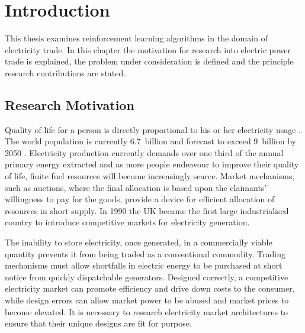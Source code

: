 \chapter{Introduction}
This thesis examines reinforcement learning algorithms in the domain of
electricity trade.  In this chapter the motivation for research into
electric power trade is explained, the problem under consideration is defined
and the principle research contributions are stated.

\section{Research Motivation}
Quality of life for a person is directly proportional to his or her electricity
usage \cite{alam:qol}.  The world population is currently 6.7~billion and
forecast to exceed 9~billion by 2050 \cite{un:pop}. Electricity production
currently demands over one third of the annual primary energy extracted
\cite{iea:2010} and as more people endeavour to improve their quality of life,
finite fuel resources will become increasingly scarce. Market mechanisms, such
as auctions, where the final allocation is based upon the claimants' willingness
to pay for the goods, provide a device for efficient allocation of resources in
short supply.  In 1990 the UK became the first large industrialised
country to introduce competitive markets for electricity generation.

The inability to store electricity, once generated, in a commercially viable
quantity prevents it from being traded as a conventional commodity. Trading
mechanisms must allow shortfalls in electric energy to be purchased at short
notice from quickly dispatchable generators.
Designed correctly, a competitive electricity market can promote efficiency and
drive down costs to the consumer, while design errors can allow market
power to be abused and market prices to become elevated. It is necessary
to research electricity market architectures to ensure that their unique
designs are fit for purpose.

